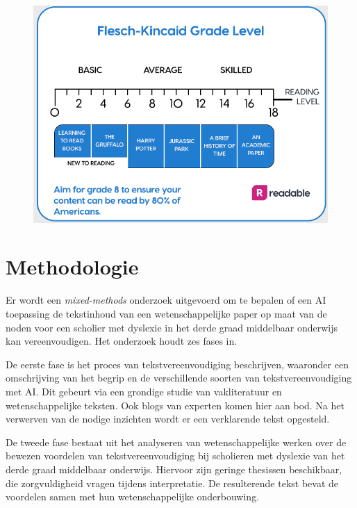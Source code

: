 \begin{figure}
	\includegraphics[width=\linewidth]{img/Screenshot_302.png}
	\caption{\autocite{Readable2021}}
\end{figure}

\section{Methodologie}%
\label{sec:methodologie}

Er wordt een \textit{mixed-methods} onderzoek uitgevoerd om te bepalen of een AI toepassing de tekstinhoud van een wetenschappelijke paper op maat van de noden voor een scholier met dyslexie in het derde graad middelbaar onderwijs kan vereenvoudigen. Het onderzoek houdt zes fases in. 

De eerste fase is het proces van tekstvereenvoudiging beschrijven, waaronder een omschrijving van het begrip en de verschillende soorten van tekstvereenvoudiging met AI. Dit gebeurt via een grondige studie van vakliteratuur en wetenschappelijke teksten. Ook blogs van experten komen hier aan bod. Na het verwerven van de nodige inzichten wordt er een verklarende tekst opgesteld.

De tweede fase bestaat uit het analyseren van wetenschappelijke werken over de bewezen voordelen van tekstvereenvoudiging bij scholieren met dyslexie van het derde graad middelbaar onderwijs. Hiervoor zijn geringe thesissen beschikbaar, die zorgvuldigheid vragen tijdens interpretatie. De resulterende tekst bevat de voordelen samen met hun wetenschappelijke onderbouwing.

